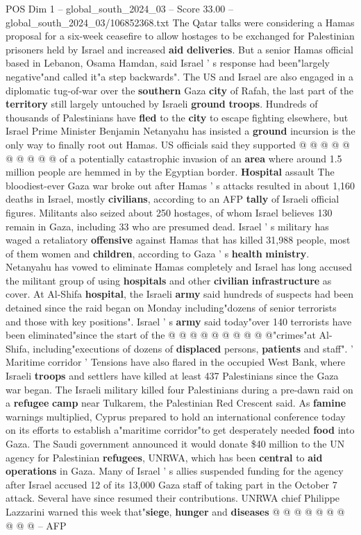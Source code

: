 \begin{textsample}{POS Dim 1 – global\_south\_2024\_03 – Score 33.00 – global\_south\_2024\_03/106852368.txt}
The Qatar talks were considering a Hamas proposal for a six-week ceasefire to allow hostages to be exchanged for Palestinian prisoners held by Israel and increased \textbf{aid} \textbf{deliveries}.
But a senior Hamas official based in Lebanon, Osama Hamdan, said Israel ' s response had been"largely negative"and called it"a step backwards".
The US and Israel are also engaged in a diplomatic tug-of-war over the \textbf{southern} Gaza \textbf{city} of Rafah, the last part of the \textbf{territory} still largely untouched by Israeli \textbf{ground} \textbf{troops}.
Hundreds of thousands of Palestinians have \textbf{fled} to the \textbf{city} to escape fighting elsewhere, but Israel Prime Minister Benjamin Netanyahu has insisted a \textbf{ground} incursion is the only way to finally root out Hamas.
US officials said they supported @ @ @ @ @ @ @ @ @ @ of a potentially catastrophic invasion of an \textbf{area} where around 1.5 million people are hemmed in by the Egyptian border. \textbf{Hospital} assault The bloodiest-ever Gaza war broke out after Hamas ' s attacks resulted in about 1,160 deaths in Israel, mostly \textbf{civilians}, according to an AFP \textbf{tally} of Israeli official figures.
Militants also seized about 250 hostages, of whom Israel believes 130 remain in Gaza, including 33 who are presumed dead.
Israel ' s military has waged a retaliatory \textbf{offensive} against Hamas that has killed 31,988 people, most of them women and \textbf{children}, according to Gaza ' s \textbf{health} \textbf{ministry}.
Netanyahu has vowed to eliminate Hamas completely and Israel has long accused the militant group of using \textbf{hospitals} and other \textbf{civilian} \textbf{infrastructure} as cover.
At Al-Shifa \textbf{hospital}, the Israeli \textbf{army} said hundreds of suspects had been detained since the raid began on Monday including"dozens of senior terrorists and those with key positions".
Israel ' s \textbf{army} said today"over 140 terrorists have been eliminated"since the start of the @ @ @ @ @ @ @ @ @ @"crimes"at Al-Shifa, including"executions of dozens of \textbf{displaced} persons, \textbf{patients} and staff". ' Maritime corridor ' Tensions have also flared in the occupied West Bank, where Israeli \textbf{troops} and settlers have killed at least 437 Palestinians since the Gaza war began.
The Israeli military killed four Palestinians during a pre-dawn raid on a \textbf{refugee} \textbf{camp} near Tulkarem, the Palestinian Red Crescent said.
As \textbf{famine} warnings multiplied, Cyprus prepared to hold an international conference today on its efforts to establish a"maritime corridor"to get desperately needed \textbf{food} into Gaza.
The Saudi government announced it would donate \$40 million to the UN agency for Palestinian \textbf{refugees}, UNRWA, which has been \textbf{central} to \textbf{aid} \textbf{operations} in Gaza.
Many of Israel ' s allies suspended funding for the agency after Israel accused 12 of its 13,000 Gaza staff of taking part in the October 7 attack.
Several have since resumed their contributions.
UNRWA chief Philippe Lazzarini warned this week that"\textbf{siege}, \textbf{hunger} and \textbf{diseases} @ @ @ @ @ @ @ @ @ @ -- AFP


\end{textsample}
